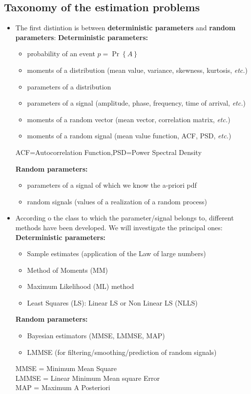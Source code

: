 \subsection{Taxonomy of the estimation problems}
\begin{itemize}
    \item The first distintion is between \textbf{deterministic parameters} and \textbf{random parameters}:
    \textbf{Deterministic parameters:}
\begin{itemize}
    \item probability of an event $p = \Pr\left\{A\right\}$
    \item moments of a distribution (mean value, variance, skewness, kurtosis, \textit{etc.})
    \item parameters of a distribution
    \item parameters of a signal (amplitude, phase, frequency, time of arrival, \textit{etc.})
    \item moments of a random vector (mean vector, correlation matrix, \textit{etc.})
    \item moments of a random signal (mean value function, ACF, PSD, \textit{etc.})
\end{itemize}
ACF=Autocorrelation Function,\quad PSD=Power Spectral Density

\textbf{Random parameters:}
\begin{itemize}
    \item parameters of a signal of which we know the a-priori pdf
    \item random signals (values of a realization of a random process)
\end{itemize}
\item According o the class to which the parameter/signal belongs to, different methods have been developed. We will investigate the principal ones:
\textbf{Deterministic parameters:}
\begin{itemize}
    \item Sample estimates (application of the Law of large numbers)
    \item Method of Moments (MM)
    \item Maximum Likelihood (ML) method
    \item Least Squares (LS): Linear LS or Non Linear LS (NLLS)
\end{itemize}

\textbf{Random parameters:}
\begin{itemize}
    \item Bayesian estimators (MMSE, LMMSE, MAP)
    \item LMMSE (for filtering/smoothing/prediction of random signals)
\end{itemize}

MMSE = Minimum Mean Square\\
LMMSE = Linear Minimum Mean square Error\\
MAP = Maximum A Posteriori
\end{itemize}

